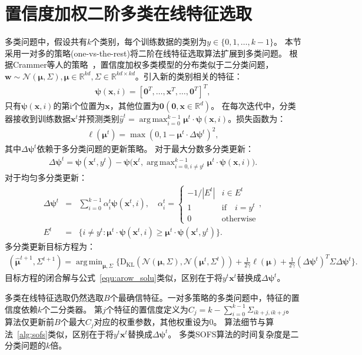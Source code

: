 \documentclass[doctor]{ustcthesis}
\def \w  {\mathbf{w}}
\def \x {\mathbf{x}}
\def \vpsi {\boldsymbol{\psi}}
\def \zero {\mathbf{0}}
\DeclareMathOperator*{\argmax}{arg\,max}
\DeclareMathOperator*{\argmin}{arg\,min}
\def \R {\mathbb{R}}
\def \Mu {\pmb{\mu}}
\def \Nn {\mathcal{N}}
\def \DKL   {\mathrm{D_{KL}}}
\begin{document}
\section{置信度加权二阶多类在线特征选取}\label{ssec:smofs}
多类问题中，假设共有$k$个类别，每个训练数据的类别为$y\in\{0,1,\ldots,k-1\}$。
本节采用一对多的策略(one-vs-the-rest)将二阶在线特征选取算法扩展到多类问题。
根据Crammer等人的策略~\cite{crammer2009multi}，置信度加权多类模型的分布类似于二分类问题，
$\w\sim\Nn(\Mu,\Sigma), \Mu \in \R^{kd}, \Sigma\in\R^{kd\times
kd}$。引入新的类别相关的特征：
\begin{eqnarray*}
    \vpsi(\x,i) = [\zero^T,\ldots,\x^T,\ldots,\zero^T]^T,
\end{eqnarray*}
只有$\vpsi(\x,i)$的第i个位置为$\x$，其他位置为$\zero(\zero, \x \in \R^d)$。
在每次迭代中，分类器接收到训练数据$\x^t$并预测类别$\hat{y}^t =
\argmax_{i=0}^{k-1}{\Mu^t \cdot \vpsi(\x,i)}$。损失函数为：
\begin{eqnarray}
    \ell(\Mu^t) = \max(0,1 - \Mu^t \cdot \Delta\vpsi^t)^2,
\end{eqnarray}
其中$\Delta\vpsi^t$依赖于多分类问题的更新策略。
对于最大分数多分类更新：
\begin{eqnarray}
    \Delta\vpsi^t = \vpsi(\x^t,y^t) - \vpsi(\x^t,\argmax_{i=0,i \neq y^t}^{k-1}{\Mu^t
    \cdot \vpsi(\x,i))}.
\end{eqnarray}
对于均匀多分类更新：
\begin{eqnarray}
    \Delta\vpsi^t &=& \sum_{i=0}^{k-1}\alpha^{t}_{i}\vpsi(\x^t,i), \quad
    \alpha^{t}_{i} =
    \begin{cases}
        -1 / |E^t|& i\in E^t\\
        1 & \text{if}\quad i = y^t\\
        0 & \text{otherwise}
    \end{cases}, \\
    E^t &=& \{i \neq y^t: \Mu^t \cdot \vpsi(\x^t, i)\geq \Mu^t \cdot
    \vpsi(\x^t,y^t)\}.
\end{eqnarray}
多分类更新目标方程为：
\small
\begin{eqnarray}
    (\hat{\Mu}^{t+1},\Sigma^{t+1}) =
    \argmin_{\Mu,\Sigma}\big\{\DKL(\Nn(\Mu,\Sigma),
        \Nn(\Mu^t,\Sigma^t)) + \frac{1}{2\gamma}\ell(\Mu) +
    \frac{1}{2\gamma}(\Delta\vpsi^t)^T\Sigma\Delta\vpsi^t\big\}.
    \label{equ:multi_arow_obj}
\end{eqnarray}
\normalsize
目标方程的闭合解与公式~\eqref{equ:arow_solu}类似，区别在于将$y^t\x^t$替换成$\Delta\vpsi^t$。

多类在线特征选取仍然选取$B$个最确信特征。一对多策略的多类问题中，特征的置信度依赖$k$个二分类器。
第$j$个特征的置信度定义为$C_j = k -
\sum_{i=0}^{k-1}\Sigma_{ik+j,ik+j}$。算法仅更新前$B$个最大$C_j$对应的权重参数，其他权重设为$0$。
算法细节与算法~\ref{alg:sofs}类似，区别在于将$y^t\x^t$替换成$\Delta\vpsi^t$。
多类SOFS算法的时间复杂度是二分类问题的$k$倍。
\end{document}
